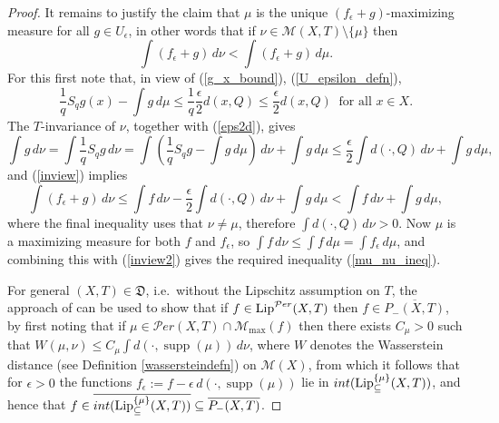 \documentclass[reqno,11pt]{amsart}
\theoremstyle{definition}
\theoremstyle{remark}
\theoremstyle{remark}
\def\m{\mathcal M}
\def\per{{\mathcal{P}er}}
\def\lip{{\rm Lip}}
\newcommand{\supp}{\operatorname{supp}}
\def\D{\mathfrak{D}}
\numberwithin{equation}{section}
\begin{document}
\begin{proof}
It remains to justify the claim that $\mu$ is the unique $(f_\epsilon+g)$-maximizing measure
for all  $g\in U_\epsilon$, in other words that if
$\nu\in\m(X,T) \setminus \{\mu\}$ then
\begin{equation}\label{mu_nu_ineq}
\int (f_\epsilon + g)\, d\nu
<
\int (f_\epsilon + g)\, d\mu .
\end{equation}
For this first note that, in view of (\ref{g_x_bound}), (\ref{U_epsilon_defn}),
\begin{equation}\label{eps2d}
\frac{1}{q}S_q g(x) - \int g\, d\mu \le \frac{1}{q} \frac{\epsilon}{2} d(x,Q) \le \frac{\epsilon}{2} d(x,Q)
\
\text{ for all }x\in X.
\end{equation}
The $T$-invariance of $\nu$, together with (\ref{eps2d}), gives
\begin{equation}\label{inview}
\int g\, d\nu = \int \frac{1}{q} S_q g\, d\nu
= \int \left( \frac{1}{q}S_q g - \int g\, d\mu \right)\, d\nu + \int g\, d\mu
\le \frac{\epsilon}{2} \int d(\cdot,Q)\, d\nu + \int g\, d\mu,
\end{equation}
and (\ref{inview}) implies
\begin{equation}\label{inview2}
\int (f_\epsilon + g)\, d\nu
\le  \int f\, d\nu -\frac{\epsilon}{2}\int d(\cdot,Q)\, d\nu + \int g\, d\mu
<  \int f\, d\nu  + \int g\, d\mu,
\end{equation}
where the final inequality uses that $\nu\neq\mu$, therefore $\int d(\cdot,Q)\, d\nu >0$.
Now $\mu$ is a maximizing measure for both $f$ and $f_\epsilon$, so
$\int f\, d\nu \le \int f\, d\mu = \int f_\epsilon\, d\mu$, and combining this with (\ref{inview2}) gives the required
inequality (\ref{mu_nu_ineq}).

For general $(X,T)\in\D$, i.e.~without the Lipschitz assumption on $T$,
the approach of \cite{BZ15} can be used
to show that if 
$f\in \lip^\per(X,T)$
then $f\in \overline{P_-(X,T)}$,
by first noting that if $\mu\in\per(X,T)\cap\m_{\max}(f)$ then there exists $C_\mu>0$
such that $W(\mu,\nu)\le C_\mu \int d(\cdot,\supp(\mu))\, d\nu$,
where $W$ denotes the Wasserstein distance (see Definition \ref{wassersteindefn}) on $\m(X)$,
from which it follows that for $\epsilon>0$ the functions
$f_\epsilon:=f-\epsilon\, d(\cdot,\supp(\mu))$ lie in 
$int(\lip_\subseteq^{\{\mu\}}(X,T))$, and hence that
$f\in \overline{ int(\lip_\subseteq^{\{\mu\}}(X,T))} \subseteq \overline{P_-(X,T)}$.
\end{proof}
\end{document}

